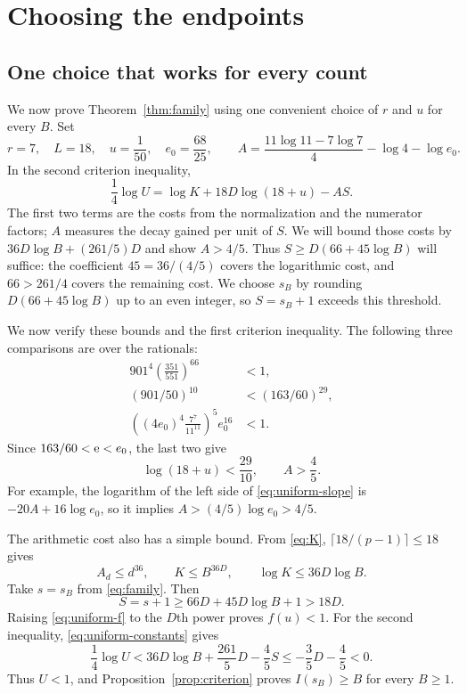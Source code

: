 \section{Choosing the endpoints}\label{sec:endpoints}

\subsection{One choice that works for every count}

We now prove Theorem~\ref{thm:family} using one convenient choice
of $r$ and $u$ for every $B$. Set
\[
 r=7,\quad L=18,\quad u=\frac1{50},\quad e_0=\frac{68}{25},
 \qquad A=\frac{11\log11-7\log7}{4}-\log4-\log e_0.
\]
In the second criterion inequality,
\[
 \frac14\log U=\log K+18D\log(18+u)-AS.
\]
The first two terms are the costs from the normalization and the
numerator factors; $A$ measures the decay gained per unit of $S$.
We will bound those costs by $36D\log B+(261/5)D$ and show
$A>4/5$. Thus $S\ge D(66+45\log B)$ will suffice: the coefficient
$45=36/(4/5)$ covers the logarithmic cost, and $66>261/4$ covers
the remaining cost. We choose $s_B$ by rounding $D(66+45\log B)$
up to an even integer, so $S=s_B+1$ exceeds this threshold.

We now verify these bounds and the first criterion inequality.
The following three comparisons are over the rationals:
\begin{align}
 901^4\left(\frac{351}{551}\right)^{66}&<1,
       \label{eq:uniform-f}\\
 (901/50)^{10}&<(163/60)^{29},\label{eq:uniform-log}\\
 \left((4e_0)^4\frac{7^7}{11^{11}}\right)^5e_0^{16}&<1.
       \label{eq:uniform-slope}
\end{align}
Since $163/60<\mathrm e<e_0$, the last two give
\begin{equation}\label{eq:uniform-constants}
 \log(18+u)<\frac{29}{10},\qquad A>\frac45.
\end{equation}
For example, the logarithm of the left side of
\eqref{eq:uniform-slope} is $-20A+16\log e_0$, so it implies
$A>(4/5)\log e_0>4/5$.

The arithmetic cost also has a simple bound. From \eqref{eq:K},
$\lceil18/(p-1)\rceil\le18$ gives
\[
 A_d\le d^{36},\qquad K\le B^{36D},\qquad
 \log K\le36D\log B.
\]
Take $s=s_B$ from \eqref{eq:family}. Then
\[
 S=s+1\ge66D+45D\log B+1>18D.
\]
Raising \eqref{eq:uniform-f} to the $D$th power proves $f(u)<1$.
For the second inequality, \eqref{eq:uniform-constants} gives
\[
 \frac14\log U<36D\log B+\frac{261}{5}D-\frac45S
 \le-\frac35D-\frac45<0.
\]
Thus $U<1$, and Proposition~\ref{prop:criterion} proves
$I(s_B)\ge B$ for every $B\ge1$.


